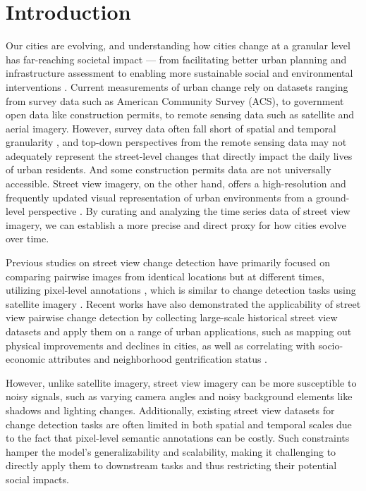 \documentclass[letterpaper]{article} %
\begin{document}
\section{Introduction}
Our cities are evolving, and understanding how cities change at a granular level has far-reaching societal impact --- from facilitating better urban planning and infrastructure assessment to enabling more sustainable social and environmental interventions \cite{Daniel2015Goal1M,Seto2017SustainabilityIA}.
Current measurements of urban change rely on datasets ranging from survey data such as American Community Survey (ACS), to government open data like construction permits, to remote sensing data such as satellite and aerial imagery. However, survey data often fall short of spatial and temporal granularity \cite{hwang14}, and top-down perspectives from the remote sensing data may not adequately represent the street-level changes that directly impact the daily lives of urban residents. And some construction permits data are not universally accessible.
Street view imagery, on the other hand, offers a high-resolution and frequently updated visual representation of urban environments from a ground-level perspective \cite{Huang2022DetectingNG}. By curating and analyzing the time series data of street view imagery, we can establish a more precise and direct proxy for how cities evolve over time.

Previous studies on street view change detection have primarily focused on comparing pairwise images from identical locations but at different times, utilizing pixel-level annotations \cite{Sakurada2015ChangeDF,sakurada2020weakly}, which is similar to change detection tasks using satellite imagery \cite{Leenstra2021SelfsupervisedPE,Shi2021ADS}. Recent works have also demonstrated the applicability of street view pairwise change detection by collecting large-scale historical street view datasets and apply them on a range of urban applications, such as mapping out physical improvements and declines in cities, as well as correlating with socio-economic attributes and neighborhood gentrification status \cite{Naik7571, Huang2022DetectingNG}.

However, unlike satellite imagery, street view imagery can be more susceptible to noisy signals, such as varying camera angles and noisy background elements like shadows and lighting changes. Additionally, existing street view datasets for change detection tasks are often limited in both spatial and temporal scales due to the fact that pixel-level semantic annotations can be costly. Such constraints hamper the model's generalizability and scalability, making it challenging to directly apply them to downstream tasks and thus restricting their potential social impacts.
\end{document}
